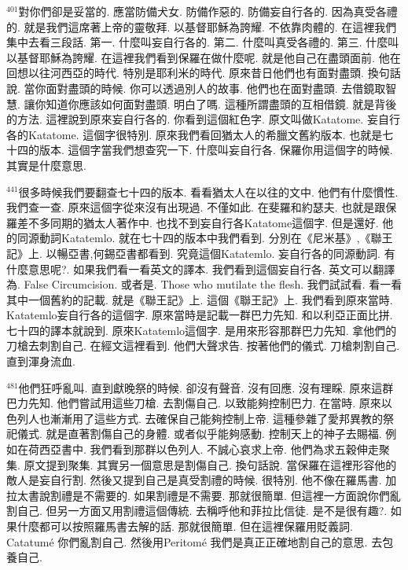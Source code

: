 \documentclass{book}
\begin{document}
$^{401}$對你們卻是妥當的.
應當防備犬女.
防備作惡的.
防備妄自行各的.
因為真受各禮的.
就是我們這席著上帝的靈敬拜.
以基督耶穌為誇耀.
不依靠肉體的.
在這裡我們集中去看三段話.
第一.
什麼叫妄自行各的.
第二.
什麼叫真受各禮的.
第三.
什麼叫以基督耶穌為誇耀.
在這裡我們看到保羅在做什麼呢.
就是他自己在盡頭面前.
他在回想以往河西亞的時代.
特別是耶利米的時代.
原來昔日他們也有面對盡頭.
換句話說.
當你面對盡頭的時候.
你可以透過別人的故事.
他們也在面對盡頭.
去借鏡取智慧.
讓你知道你應該如何面對盡頭.
明白了嗎.
這種所謂盡頭的互相借鏡.
就是背後的方法.
這裡說到原來妄自行各的.
你看到這個紅色字.
原文叫做Katatome.
妄自行各的Katatome.
這個字很特別.
原來我們看回猶太人的希臘文舊約版本.
也就是七十四的版本.
這個字當我們想查究一下.
什麼叫妄自行各.
保羅你用這個字的時候.
其實是什麼意思.

$^{441}$很多時候我們要翻查七十四的版本.
看看猶太人在以往的文中.
他們有什麼慣性.
我們查一查.
原來這個字從來沒有出現過.
不僅如此.
在斐羅和約瑟夫.
也就是跟保羅差不多同期的猶太人著作中.
也找不到妄自行各Katatome這個字.
但是還好.
他的同源動詞Katatemlo.
就在七十四的版本中我們看到.
分別在《尼米基》,《聯王記》上.
以暢亞書,何錫亞書都看到.
究竟這個Katatemlo.
妄自行各的同源動詞.
有什麼意思呢?.
如果我們看一看英文的譯本.
我們看到這個妄自行各.
英文可以翻譯為.
False Circumcision.
或者是.
Those who mutilate the flesh.
我們試試看.
看一看其中一個舊約的記載.
就是《聯王記》上.
這個《聯王記》上.
我們看到原來當時.
Katatemlo妄自行各的這個字.
原來當時是記載一群巴力先知.
和以利亞正面比拼.
七十四的譯本就說到.
原來Katatemlo這個字.
是用來形容那群巴力先知.
拿他們的刀槍去刺割自己.
在經文這裡看到.
他們大聲求告.
按著他們的儀式.
刀槍刺割自己.
直到渾身流血.

$^{481}$他們狂呼亂叫.
直到獻晚祭的時候.
卻沒有聲音.
沒有回應.
沒有理睬.
原來這群巴力先知.
他們嘗試用這些刀槍.
去割傷自己.
以致能夠控制巴力.
在當時.
原來以色列人也漸漸用了這些方式.
去確保自己能夠控制上帝.
這種參雜了愛邦異教的祭祀儀式.
就是直著割傷自己的身體.
或者似乎能夠感動.
控制天上的神子去賜福.
例如在荷西亞書中.
我們看到那群以色列人.
不誠心哀求上帝.
他們為求五穀伸走聚集.
原文提到聚集.
其實另一個意思是割傷自己.
換句話說.
當保羅在這裡形容他的敵人是妄自行割.
然後又提到自己是真受割禮的時候.
很特別.
他不像在羅馬書.
加拉太書說割禮是不需要的.
如果割禮是不需要.
那就很簡單.
但這裡一方面說你們亂割自己.
但另一方面又用割禮這個傳統.
去稱呼他和菲拉比信徒.
是不是很有趣?.
如果什麼都可以按照羅馬書去解的話.
那就很簡單.
但在這裡保羅用貶義詞.
Catatumé 你們亂割自己.
然後用Peritomé 我們是真正正確地割自己的意思.
去包養自己.
\end{document}
